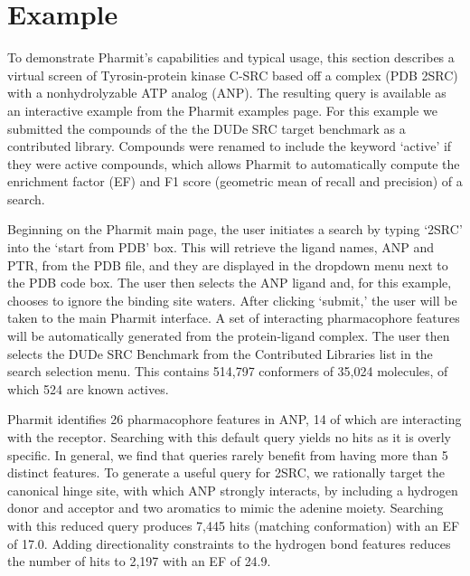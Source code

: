 \section{Example}

To demonstrate Pharmit's capabilities and typical usage, this section describes a virtual screen of Tyrosin-protein kinase C-SRC based off a complex (PDB 2SRC) with a nonhydrolyzable ATP analog (ANP). The resulting query is available as an interactive example from the Pharmit examples page.  For this example we submitted the compounds of the the DUDe \cite{Mysinger_2012} SRC target benchmark as a contributed library.  Compounds were renamed to include the keyword `active' if they were active compounds, which allows Pharmit to automatically compute the enrichment factor (EF) and F1 score (geometric mean of recall and precision) of a search.

  Beginning on the Pharmit main page, the user initiates a search by typing `2SRC' into the `start from PDB' box. This will retrieve the ligand names, ANP and PTR, from the PDB file, and they are displayed in the dropdown menu next to the PDB code box. The user then selects the ANP ligand and, for this example, chooses to ignore the binding site waters. After clicking `submit,' the user will be taken to the main Pharmit interface. A set of interacting pharmacophore features will be automatically generated from the protein-ligand complex.  The user then selects the DUDe SRC Benchmark from the Contributed Libraries list in the search selection menu.  This contains 514,797 conformers of 35,024 molecules, of which 524 are known actives.
  
  Pharmit identifies 26 pharmacophore features in ANP, 14 of which are interacting with the receptor.  Searching with this default query yields no hits as it is overly specific.  In general, we find that queries rarely benefit from having more than 5 distinct features.
  To generate a useful query for 2SRC, we rationally target the canonical hinge site, with which ANP strongly interacts, by including a hydrogen donor and acceptor and two aromatics to mimic the adenine moiety.  Searching with this reduced query produces 7,445 hits (matching conformation) with an EF of 17.0.  Adding directionality constraints to the hydrogen bond features reduces the number of hits to 2,197 with an EF of 24.9.
  
